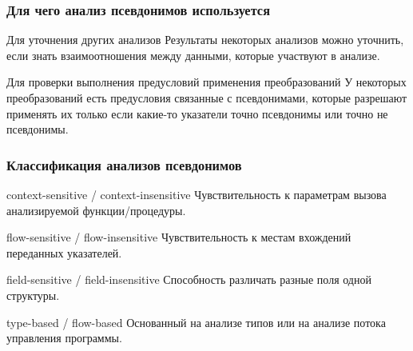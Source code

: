 \documentclass[utf8,russian]{beamer}
\begin{document}
\begin{frame}
\frametitle{Для чего анализ псевдонимов используется}

\begin{block}{Для уточнения других анализов}
Результаты некоторых анализов можно уточнить, если знать взаимоотношения между данными, которые участвуют в анализе.
\end{block}

\begin{block}{Для проверки выполнения предусловий применения преобразований}
У некоторых преобразований есть предусловия связанные с псевдонимами, которые разрешают применять их только если какие-то указатели точно псевдонимы или точно не псевдонимы.
\end{block}

\end{frame}


\begin{frame}
\frametitle{Классификация анализов псевдонимов}

\begin{block}{context-sensitive / context-insensitive}
Чувствительность к параметрам вызова анализируемой функции/процедуры.
\end{block}

\begin{block}{flow-sensitive / flow-insensitive}
Чувствительность к местам вхождений переданных указателей.
\end{block}

\begin{block}{field-sensitive / field-insensitive}
Способность различать разные поля одной структуры.
\end{block}

\begin{block}{type-based / flow-based}
Основанный на анализе типов или на анализе потока управления программы.
\end{block}

\end{frame}

\end{document}
